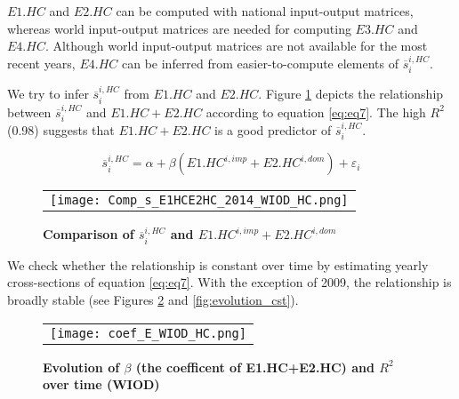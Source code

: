 \documentclass[12pt,a4paper]{paper}
\begin{document}
$E1.HC$ and $E2.HC$ can be computed with national input-output matrices, whereas world input-output matrices are needed for computing $E3.HC$ and $E4.HC$. 
Although world input-output matrices are not available for the most recent years, $E4.HC$ can be inferred from easier-to-compute elements of $\overline{s}_{i}^{i,HC}$.

%
%
We try to infer $\overline{s}_{i}^{i,HC}$ from $E1.HC$ and $E2.HC$.
Figure \ref{fig:ratiodir_WIOD} depicts the relationship between $\overline{s}_{i}^{i,HC}$ and $E1.HC+E2.HC$ according to equation \ref{eq:eq7}. 
The high $R^2$ (0.98) suggests that $E1.HC+E2.HC$ is a good predictor of $\overline{s}_{i}^{i,HC}$. 

 \begin{equation}
\overline{s}_{i}^{i,HC}=\alpha + \beta  \left(E1.HC^{i,imp}+E2.HC^{i,dom}\right) +\varepsilon_i 
\label{eq:eq7}
 \end{equation}
 


\begin{figure}[H]
\centering
\caption{\footnotesize{\textbf{Comparison of $\overline{s}_{i}^{i,HC}$ and $E1.HC^{i,imp}+E2.HC^{i,dom}$}}}
\begin{tabular}{c}
\texttt{[image: Comp\_s\_E1HCE2HC\_2014\_WIOD\_HC.png]}\\
\end{tabular}
\label{fig:ratiodir_WIOD}
\end{figure}

We check whether the relationship is constant over time by estimating yearly cross-sections of equation \ref{eq:eq7}. 
With the exception of 2009, the relationship is broadly stable (see Figures \ref{fig:evolution_b} and \ref{fig:evolution_cst}).

\begin{figure}[H]
\centering
\caption{\footnotesize{\textbf{Evolution of $\beta$ (the coefficent of E1.HC+E2.HC) and $R^2$ over time (WIOD)}}}
\begin{tabular}{c}
\texttt{[image: coef\_E\_WIOD\_HC.png]}\\
\end{tabular}
\label{fig:evolution_b}
\end{figure}
\end{document}
